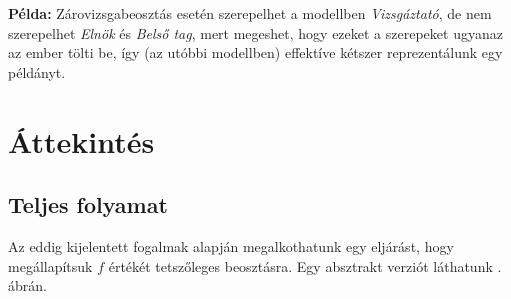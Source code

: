 \documentclass[twocolumn]{article}
\theoremstyle{definition}
\newcommand{\pl}{ \textbf{Példa:} }
\begin{document}
    \pl Zárovizsgabeosztás esetén szerepelhet a modellben \textit{Vizsgáztató}, de nem szerepelhet \textit{Elnök} és \textit{Belső tag}, mert megeshet, hogy ezeket a szerepeket ugyanaz az ember tölti be, így (az utóbbi modellben) effektíve kétszer reprezentálunk egy példányt.

\section{Áttekintés}
    \subsection{Teljes folyamat}
    
    Az eddig kijelentett fogalmak alapján megalkothatunk egy eljárást, hogy megállapítsuk $f$ értékét tetszőleges beosztásra. Egy absztrakt verziót láthatunk \az{\ref{fig:flow}}. ábrán.
    
\end{document}
